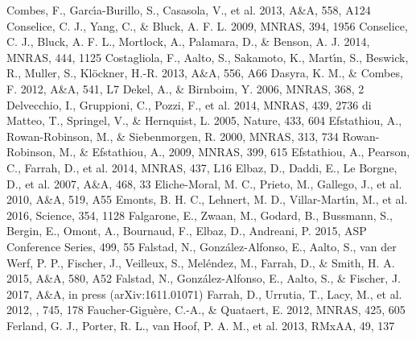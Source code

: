 \documentclass{pasa}%
\begin{document}
\begin{thebibliography}{}
   Combes, F., Garc\'{\i}a-Burillo, S.,
    Casasola, V., et al. 2013, A\&A, 558, A124
   Conselice, C. J., Yang, C., \&
    Bluck, A. F. L. 2009, MNRAS, 394, 1956
   Conselice, C. J., Bluck, A. F. L.,
    Mortlock, A., Palamara, D., \& Benson, A. J. 2014, MNRAS, 444, 1125
   Costagliola, F., Aalto, S.,
    Sakamoto, K., Mart\'{\i}n, S., Beswick, R., Muller, S., Kl\"ockner,
    H.-R. 2013, A\&A, 556, A66
   Dasyra, K. M., \& Combes, F. 2012,
    A\&A, 541, L7
   Dekel, A., \& Birnboim, Y. 2006,
    MNRAS, 368, 2
   Delvecchio, I., Gruppioni, C.,
    Pozzi, F., et al. 2014, MNRAS, 439, 2736
   di Matteo, T., Springel, V., \&
    Hernquist, L. 2005, Nature, 433, 604
   Efstathiou, A., Rowan-Robinson, M.,
    \& Siebenmorgen, R. 2000, MNRAS, 313, 734
   Rowan-Robinson, M., \&
    Efstathiou, A., 2009, MNRAS, 399, 615
   Efstathiou, A., Pearson, C.,
    Farrah, D., et al. 2014, MNRAS, 437, L16
   Elbaz, D., Daddi, E., Le Borgne, D., et
    al. 2007, A\&A, 468, 33
   Eliche-Moral, M. C., Prieto, M.,
    Gallego, J., et al. 2010, A\&A, 519, A55
   Emonts, B. H. C., Lehnert, M. D.,
    Villar-Mart\'{\i}n, M., et al. 2016, Science, 354, 1128
   Falgarone, E., Zwaan, M., Godard,
    B., Bussmann, S., Bergin, E., Omont, A., Bournaud, F., Elbaz, D.,
    Andreani, P. 2015, ASP Conference Series, 499, 55
   Falstad, N., Gonz\'alez-Alfonso, E.,
    Aalto, S., van der Werf, P. P., Fischer, J., Veilleux, S., Mel\'endez, M.,
    Farrah, D., \& Smith, H. A. 2015, A\&A, 580, A52  
   Falstad, N., Gonz\'alez-Alfonso, E.,
    Aalto, S., \& Fischer, J. 2017, A\&A, in press (arXiv:1611.01071)
   Farrah, D., Urrutia, T., Lacy, M., et
    al. 2012, \apj, 745, 178
   Faucher-Gigu\`ere,
    C.-A., \& Quataert, E. 2012, MNRAS, 425, 605
  Ferland, G. J., Porter, R. L., van
   Hoof, P. A. M., et al. 2013, RMxAA, 49, 137

\end{thebibliography}
\end{document}
